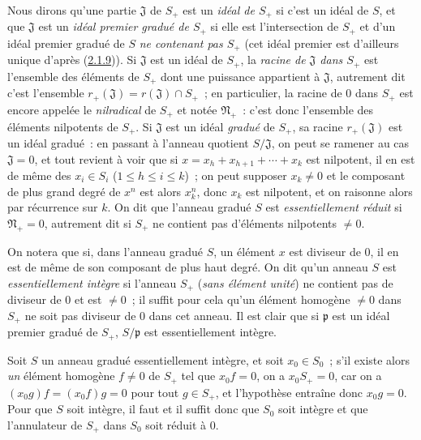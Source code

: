 \begin{env}[2.1.10]
\label{II.2.1.10-fr}
Nous dirons qu'une partie $\mathfrak{J}$ de $S_+$ est un
\emph{idéal de $S_+$} si c'est un idéal de $S$, et que $\mathfrak{J}$ est un
\emph{idéal premier gradué de $S_+$} si elle est l'intersection de $S_+$ et
d'un idéal premier gradué de $S$ \emph{ne contenant pas $S_+$} (cet idéal
premier est d'ailleurs unique d'après
(\hyperref[II.2.1.9-fr]{2.1.9})). Si $\mathfrak{J}$ est un idéal de $S_+$,
la \emph{racine de $\mathfrak{J}$ dans $S_+$} est l'ensemble des éléments de
$S_+$ dont une puissance appartient à $\mathfrak{J}$, autrement dit c'est
l'ensemble $r_+(\mathfrak{J})=r(\mathfrak{J})\cap S_+$~; en particulier, la
racine de $0$ dans $S_+$ est encore appelée le \emph{nilradical} de $S_+$ et
notée $\mathfrak{N}_+$~: c'est donc l'ensemble des éléments nilpotents de
$S_+$. Si $\mathfrak{J}$ est un idéal \emph{gradué} de $S_+$, sa racine
$r_+(\mathfrak{J})$ est un idéal gradué~: en passant à l'anneau quotient
$S/\mathfrak{J}$, on peut se ramener au cas $\mathfrak{J}=0$, et tout
revient à voir que si $x=x_h+x_{h+1}+\cdots+x_k$ est nilpotent, il en est de
même des $x_i\in S_i$ ($1\leq h\leq i\leq k$)~; on peut supposer
$x_k\neq 0$ et le composant de plus grand degré de $x^n$ est alors $x_k^n$,
donc $x_k$ est nilpotent, et on raisonne alors par récurrence sur $k$. On dit
que l'anneau gradué $S$ est \emph{essentiellement réduit} si
$\mathfrak{N}_+=0$, autrement dit si $S_+$ ne contient pas d'éléments
nilpotents $\neq 0$.
\end{env}

\begin{env}[2.1.11]
\label{II.2.1.11-fr}
On notera que si, dans l'anneau gradué $S$, un élément $x$ est diviseur de
$0$, il en est de même de son composant de plus haut degré. On dit qu'un
anneau $S$ est \emph{essentiellement intègre} si l'anneau $S_+$
(\emph{sans élément unité}) ne contient pas de diviseur de $0$ et est
$\neq 0$~; il suffit pour cela qu'un élément homogène $\neq 0$ dans $S_+$ ne
soit pas diviseur de $0$ dans cet anneau. Il est clair que si $\mathfrak{p}$
est un idéal premier gradué de $S_+$, $S/\mathfrak{p}$ est essentiellement
intègre.

Soit $S$ un anneau gradué essentiellement intègre, et soit $x_0\in S_0$~;
s'il existe alors \emph{un} élément homogène $f\neq 0$ de $S_+$ tel que
$x_0f=0$, on a $x_0S_+=0$, car on a $(x_0g)f=(x_0f)g=0$ pour tout
$g\in S_+$, et l'hypothèse entraîne donc $x_0g=0$. Pour que $S$ soit
intègre, il faut et il suffit donc que $S_0$ soit intègre et que l'annulateur
de $S_+$ dans $S_0$ soit réduit à $0$.
\end{env}


